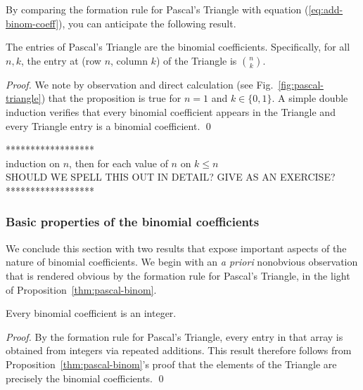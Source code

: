 \medskip

By comparing the formation rule for Pascal's Triangle with equation
(\ref{eq:add-binom-coeff}), you can anticipate the following result.

\begin{prop}
\label{thm:pascal-binom}
The entries of Pascal's Triangle are the binomial coefficients.
Specifically, for all $n,k$, the entry at (row $n$, column $k$) of the
Triangle is $\displaystyle {n \choose k}$.
\end{prop}

\begin{proof}
We note by observation and direct calculation (see
Fig.~\ref{fig:pascal-triangle}) that the proposition is true for $n =
1$ and $k \in \{0, 1\}$.  A simple double induction verifies that
every binomial coefficient appears in the Triangle and every Triangle
entry is a binomial coefficient.  \qed
\end{proof}

\noindent
****************** \\
induction on $n$, then for each value of $n$ on $k \leq n$ \\
{\Arny SHOULD WE SPELL THIS OUT IN DETAIL?  GIVE AS AN EXERCISE?} \\
******************

\subsubsection{Basic properties of the binomial coefficients}

We conclude this section with two results that expose important
aspects of the nature of binomial coefficients.  We begin with an {\it
  a priori} nonobvious observation that is rendered obvious by the
formation rule for Pascal's Triangle, in the light of
Proposition~\ref{thm:pascal-binom}.

\begin{prop}
\label{thm:binomcoeff-integer}
Every binomial coefficient is an integer.
\end{prop}

\begin{proof}
By the formation rule for Pascal's Triangle, every entry in that array
is obtained from integers via repeated additions.  This result
therefore follows from Proposition~\ref{thm:pascal-binom}'s proof that
the elements of the Triangle are precisely the binomial coefficients.  \qed
\end{proof}

